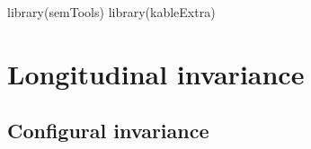 \documentclass[
  letterpaper,
  DIV=11,
  numbers=noendperiod]{scrreprt}
\newenvironment{Shaded}{\begin{snugshade}}{\end{snugshade}}
\newcommand{\FunctionTok}[1]{\textcolor[rgb]{0.28,0.35,0.67}{#1}}
\newcommand{\NormalTok}[1]{\textcolor[rgb]{0.00,0.23,0.31}{#1}}
\begin{document}
\begin{Shaded}
\begin{Highlighting}[]
\FunctionTok{library}\NormalTok{(semTools)}
\FunctionTok{library}\NormalTok{(kableExtra)}
\end{Highlighting}
\end{Shaded}

\hypertarget{longitudinal-invariance}{%
\section{Longitudinal invariance}\label{longitudinal-invariance}}

\hypertarget{configural-invariance}{%
\subsection{Configural invariance}\label{configural-invariance}}
\end{document}
